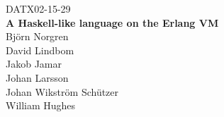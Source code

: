\newpage
\thispagestyle{empty}
\begin{center}
	\textsc{\large DATX02-15-29}\\[4cm]
	\textbf{\Large A Haskell-like language on the Erlang VM} \\[1cm]
	{\Large Björn Norgren}\\[2.0cm]
  {\Large David Lindbom}\\[2.0cm]
  {\Large Jakob Jamar}\\[2.0cm]
  {\Large Johan Larsson}\\[2.0cm]
  {\Large Johan Wikström Schützer}\\[2.0cm]
  {\Large William Hughes}\\[2.0cm]
	
	\vfill	
	\begin{figure}[h!]
	\centering
         \\	
	\end{figure}	\vspace{5mm}	
	

\end{center}
